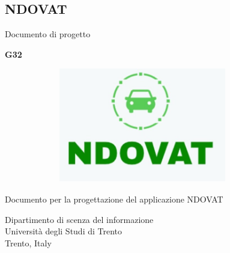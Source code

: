 \newcommand{\NameOfTheProject}{NDOVAT}

\begin{titlepage}
    \begin{center}
        \vspace*{1cm}
 
        \section*{\NameOfTheProject}
 
        \vspace{0.5cm}
        Documento di progetto
        
        \vspace{0.5cm}        
        \textbf{G32}
        
        \vspace{3cm}

        \begin{figure}[h]
            \centering
            \includegraphics[width=10cm, height=5cm]{immagini/ndovat.jpeg}
            \label{fig:logo}
        \end{figure}
 
        \vfill
             
        Documento per la progettazione del applicazione \NameOfTheProject\\
             
        \vspace{0.8cm}
      
        
             
        Dipartimento di scenza del informazione\\
        Università degli Studi di Trento\\
        Trento, Italy\\
                    
    \end{center}
 \end{titlepage}